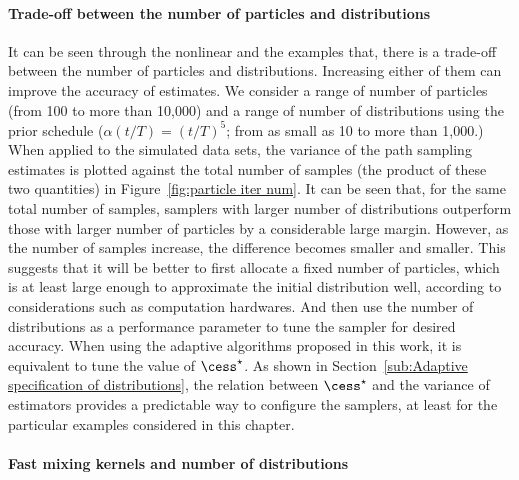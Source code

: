 

\paragraph{Trade-off between the number of particles and distributions}



It can be seen through the nonlinear \ode and the \pet examples that, there is a trade-off between the number of particles and distributions. Increasing either of them can improve the accuracy of estimates. We consider a range of number of particles (from 100 to more than 10,000) and a range of number of distributions using the prior schedule ($\alpha(t/T) = (t/T)^5$; from as small as 10 to more than 1,000.) When applied to the simulated data sets, the variance of the path sampling estimates is plotted against the total number of samples (the product of these two quantities) in Figure~\ref{fig:particle iter num}. It can be seen that, for the same total number of samples, samplers with larger number of distributions outperform those with larger number of particles by a considerable large margin. However, as the number of samples increase, the difference becomes smaller and smaller. This suggests that it will be better to first allocate a fixed number of particles, which is at least large enough to approximate the initial distribution well, according to considerations such as computation hardwares. And then use the number of distributions as a performance parameter to tune the sampler for desired accuracy. When using the adaptive algorithms proposed in this work, it is equivalent to tune the value of $\cess^\star$. As shown in Section~\ref{sub:Adaptive specification of distributions}, the relation between $\cess^\star$ and the variance of estimators provides a predictable way to configure the samplers, at least for the particular examples considered in this chapter.

\paragraph{Fast mixing \mcmc kernels and number of distributions}

